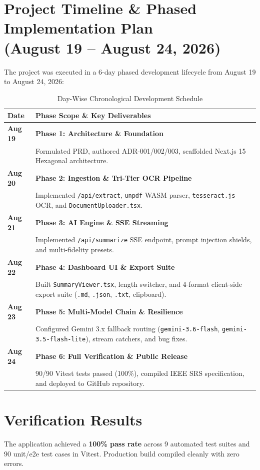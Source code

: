\documentclass[10pt,twocolumn,a4paper]{article}
\begin{document}
\section{Project Timeline \& Phased Implementation Plan\\(August 19 -- August 24, 2026)}

The project was executed in a 6-day phased development lifecycle from August 19 to August 24, 2026:

\begin{table}[h]
\centering
\small
\begin{tabularx}{\columnwidth}{@{}lX@{}}
\toprule
\textbf{Date} & \textbf{Phase Scope \& Key Deliverables} \\ \midrule
\textbf{Aug 19} & \textbf{Phase 1: Architecture \& Foundation}\\
& Formulated PRD, authored ADR-001/002/003, scaffolded Next.js 15 Hexagonal architecture. \\ \addlinespace
\textbf{Aug 20} & \textbf{Phase 2: Ingestion \& Tri-Tier OCR Pipeline}\\
& Implemented \texttt{/api/extract}, \texttt{unpdf} WASM parser, \texttt{tesseract.js} OCR, and \texttt{DocumentUploader.tsx}. \\ \addlinespace
\textbf{Aug 21} & \textbf{Phase 3: AI Engine \& SSE Streaming}\\
& Implemented \texttt{/api/summarize} SSE endpoint, prompt injection shields, and multi-fidelity presets. \\ \addlinespace
\textbf{Aug 22} & \textbf{Phase 4: Dashboard UI \& Export Suite}\\
& Built \texttt{SummaryViewer.tsx}, length switcher, and 4-format client-side export suite (\texttt{.md}, \texttt{.json}, \texttt{.txt}, clipboard). \\ \addlinespace
\textbf{Aug 23} & \textbf{Phase 5: Multi-Model Chain \& Resilience}\\
& Configured Gemini 3.x fallback routing (\texttt{gemini-3.6-flash}, \texttt{gemini-3.5-flash-lite}), stream catchers, and bug fixes. \\ \addlinespace
\textbf{Aug 24} & \textbf{Phase 6: Full Verification \& Public Release}\\
& 90/90 Vitest tests passed (100\%), compiled IEEE SRS specification, and deployed to GitHub repository. \\ \bottomrule
\end{tabularx}
\caption{Day-Wise Chronological Development Schedule}
\end{table}

\section{Verification Results}
The application achieved a \textbf{100\% pass rate} across 9 automated test suites and 90 unit/e2e test cases in Vitest. Production build compiled cleanly with zero errors.
\end{document}
